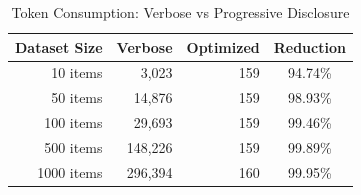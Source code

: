 
\begin{table}[h]
\centering
\caption{Token Consumption: Verbose vs Progressive Disclosure}
\label{tab:token_benchmark}
\begin{tabular}{rrrc}
\toprule
\textbf{Dataset Size} & \textbf{Verbose} & \textbf{Optimized} & \textbf{Reduction} \\
\midrule
10 items & 3,023 & 159 & 94.74\% \\
50 items & 14,876 & 159 & 98.93\% \\
100 items & 29,693 & 159 & 99.46\% \\
500 items & 148,226 & 159 & 99.89\% \\
1000 items & 296,394 & 160 & 99.95\% \\
\bottomrule
\end{tabular}
\end{table}

